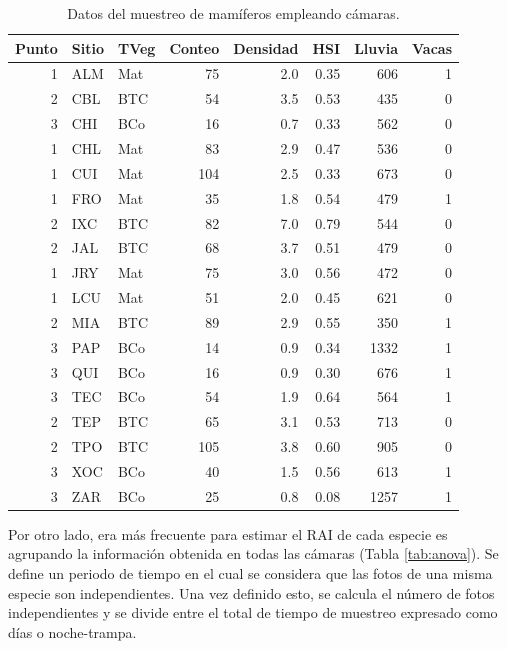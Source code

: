 \documentclass[
  10.5pt,
  a5paper]{book}
\begin{document}
\begin{table}

\caption{\label{tab:datos}Datos del muestreo de mamíferos empleando cámaras.}
\centering
\begin{tabular}[t]{r|l|l|r|r|r|r|r}
\hline
Punto & Sitio & TVeg & Conteo & Densidad & HSI & Lluvia & Vacas\\
\hline
1 & ALM & Mat & 75 & 2.0 & 0.35 & 606 & 1\\
\hline
2 & CBL & BTC & 54 & 3.5 & 0.53 & 435 & 0\\
\hline
3 & CHI & BCo & 16 & 0.7 & 0.33 & 562 & 0\\
\hline
1 & CHL & Mat & 83 & 2.9 & 0.47 & 536 & 0\\
\hline
1 & CUI & Mat & 104 & 2.5 & 0.33 & 673 & 0\\
\hline
1 & FRO & Mat & 35 & 1.8 & 0.54 & 479 & 1\\
\hline
2 & IXC & BTC & 82 & 7.0 & 0.79 & 544 & 0\\
\hline
2 & JAL & BTC & 68 & 3.7 & 0.51 & 479 & 0\\
\hline
1 & JRY & Mat & 75 & 3.0 & 0.56 & 472 & 0\\
\hline
1 & LCU & Mat & 51 & 2.0 & 0.45 & 621 & 0\\
\hline
2 & MIA & BTC & 89 & 2.9 & 0.55 & 350 & 1\\
\hline
3 & PAP & BCo & 14 & 0.9 & 0.34 & 1332 & 1\\
\hline
3 & QUI & BCo & 16 & 0.9 & 0.30 & 676 & 1\\
\hline
3 & TEC & BCo & 54 & 1.9 & 0.64 & 564 & 1\\
\hline
2 & TEP & BTC & 65 & 3.1 & 0.53 & 713 & 0\\
\hline
2 & TPO & BTC & 105 & 3.8 & 0.60 & 905 & 0\\
\hline
3 & XOC & BCo & 40 & 1.5 & 0.56 & 613 & 1\\
\hline
3 & ZAR & BCo & 25 & 0.8 & 0.08 & 1257 & 1\\
\hline
\end{tabular}
\end{table}

\pagebreak

Por otro lado, era más frecuente para estimar el RAI de cada especie es agrupando la información obtenida en todas las cámaras (Tabla \ref{tab:anova}). Se define un periodo de tiempo en el cual se considera que las fotos de una misma especie son independientes. Una vez definido esto, se calcula el número de fotos independientes y se divide entre el total de tiempo de muestreo expresado como días o noche-trampa.
\end{document}
